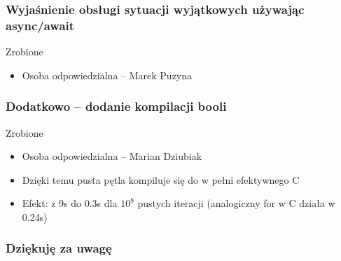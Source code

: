 \documentclass{beamer}
\begin{document}
	\begin{frame}
		\frametitle{Wyjaśnienie obsługi sytuacji wyjątkowych używając async/await}
		\color{green} Zrobione
		\begin{itemize}
			\item Osoba odpowiedzialna -- Marek Puzyna
		\end{itemize}
	\end{frame}
	
	\begin{frame}
		\frametitle{Dodatkowo -- dodanie kompilacji booli}
		\color{green} Zrobione
		\begin{itemize}
			\item Osoba odpowiedzialna -- Marian Dziubiak
			\item Dzięki temu pusta pętla kompiluje się do w pełni efektywnego C
			\item Efekt: z 9s do 0.3s dla $10^8$ pustych iteracji (analogiczny for w C działa w 0.24s)
		\end{itemize}
	\end{frame}
	
	\begin{frame}
	 \frametitle{Dziękuję za uwagę}
	\end{frame}
\end{document}
